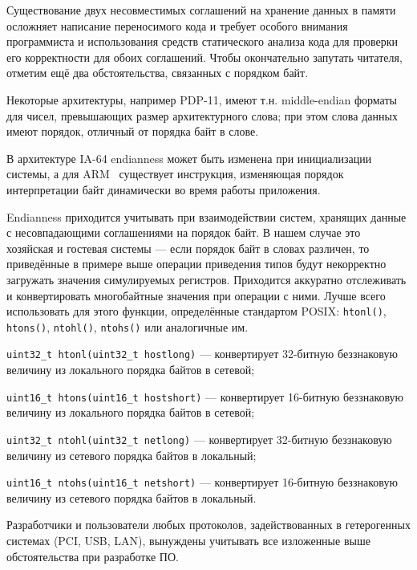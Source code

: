 Существование двух несовместимых соглашений на хранение данных в памяти осложняет написание переносимого кода и требует особого внимания программиста и использования средств статического анализа кода для проверки его корректности для обоих соглашений. Чтобы окончательно запутать читателя, отметим ещё два обстоятельства, связанных с порядком байт.

\begin{itemize*}
    \item Некоторые архитектуры, например PDP-11, имеют т.н. middle-endian форматы для чисел, превышающих размер архитектурного слова; при этом слова данных имеют порядок, отличный от порядка байт в слове.
    \item В архитектуре IA-64 endianness может быть изменена при инициализации системы, а для ARM~\cite{arm-sdg} существует инструкция, изменяющая порядок интерпретации байт динамически во время работы приложения.
\end{itemize*}

Endianness приходится учитывать при взаимодействии систем, хранящих данные с несовпадающими соглашениями на порядок байт. В нашем случае это хозяйская и гостевая системы --- если порядок байт в словах различен, то приведённые в примере выше операции приведения типов будут некорректно загружать значения симулируемых регистров. Приходится аккуратно отслеживать и конвертировать многобайтные значения при операции с ними. Лучше всего использовать для этого функции, определённые стандартом POSIX: \texttt{htonl()}, \texttt{htons()}, \texttt{ntohl()}, \texttt{ntohs()} или аналогичные им.

\begin{itemize*}
\item \texttt{uint32_t htonl(uint32_t hostlong)} --- конвертирует 32-битную беззнаковую величину из локального порядка байтов в сетевой;
\item \texttt{uint16_t htons(uint16_t hostshort)} --- конвертирует 16-битную беззнаковую величину из локального порядка байтов в сетевой;
\item \texttt{uint32_t ntohl(uint32_t netlong)} --- конвертирует 32-битную беззнаковую величину из сетевого порядка байтов в локальный;
\item \texttt{uint16_t ntohs(uint16_t netshort)} --- конвертирует 16-битную беззнаковую величину из сетевого порядка байтов в локальный.
\end{itemize*}

Разработчики и пользователи любых протоколов, задействованных в гетерогенных системах (PCI, USB, LAN), вынуждены учитывать все изложенные выше обстоятельства при разработке ПО. 

